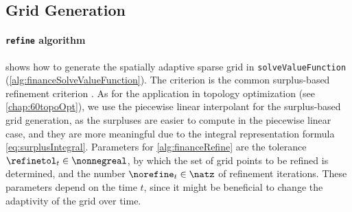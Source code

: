 \subsection{Grid Generation}
\label{sec:826gridGeneration}

\paragraph{\texttt{refine} algorithm}

 shows how to generate the spatially adaptive
sparse grid in \texttt{solveValueFunction}
(\cref{alg:financeSolveValueFunction}).
The criterion is the common surplus-based refinement criterion
\cite{Pflueger10Spatially}.
As for the application in topology optimization (see \cref{chap:60topoOpt}),
we use the piecewise linear interpolant for the surplus-based
grid generation,
as the surpluses are easier to compute in the piecewise linear case,
and they are more meaningful
due to the integral representation formula \eqref{eq:surplusIntegral}.
Parameters for \cref{alg:financeRefine} are
the tolerance $\refinetol_t \in \nonnegreal$,
by which the set of grid points to be refined is determined, and
the number $\norefine_t \in \natz$ of refinement iterations.
These parameters depend on the time $t$,
since it might be beneficial to change the adaptivity of the
grid over time.

\begin{algorithm}
  \begin{algorithmic}[1]
      \EndFor{}
    \EndFunction{}
  \end{algorithmic}
  \caption[Refinement of the value function (\texttt{refine})]{%
    In-place refinement of the value function $\valueintp[1]_t$.
    Inputs are
    the time $t$,
    the piecewise linear interpolant $\valueintp[1]_t$
    of the current iteration $t$, and
    the higher-order B-spline interpolant $\valueintp[p]_{t+1}$
    of the previous iteration $t + 1$
    (not used if $t = T$).
    The output is the updated piecewise linear interpolant $\valueintp[1]_t$
    with the refined sparse grid.%
  }%
  \label{alg:financeRefine}%
\end{algorithm}

